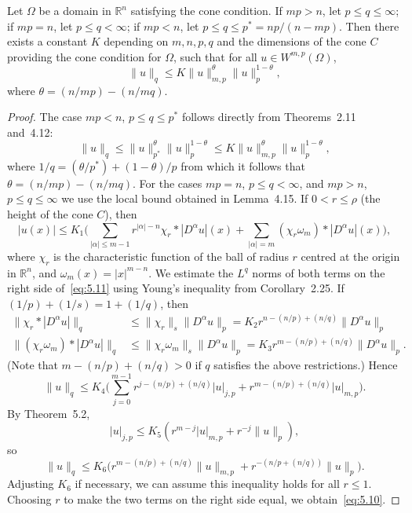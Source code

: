 \begin{theorem}
  Let $\Omega$ be a domain in $\mathbb{R}^n$ satisfying the cone
  condition. If $mp>n$, let $p\leq q\leq\infty$; if $mp=n$,
  let $p\leq q<\infty$; if $mp<n$, let $p\leq q\leq p^*=np/(n-mp)$.
  Then there exists a constant $K$ depending on $m,n,p,q$ and the
  dimensions of the cone $C$ providing the cone condition for $\Omega$,
  such that for all $u\in W^{m,p}(\Omega)$,
  \begin{equation}\label{eq:5.10}
    \|u\|_q \leq K \|u\|_{m,p}^\theta \|u\|_p^{1-\theta},
  \end{equation}
  where $\theta = (n/mp) - (n/mq)$.
\end{theorem}

\begin{proof}
  The case $mp<n$, $p\leq q\leq p^*$ follows directly from Theorems~2.11
  and~4.12:
  \[ \|u\|_q \leq \|u\|_{p^*}^\theta \|u\|_p^{1-\theta}
      \leq K\|u\|_{m,p}^\theta \|u\|_p^{1-\theta}, \]
  where $1/q = (\theta/p^*) + (1-\theta)/p$ from which it follows that
  $\theta = (n/mp) - (n/mq)$. For the cases $mp=n$, $p\leq q<\infty$,
  and $mp>n$, $p\leq q\leq\infty$ we use the local bound obtained in Lemma~4.15.
  If $0<r\leq\rho$ (the height of the cone $C$), then
  \begin{equation}\label{eq:5.11}
    |u(x)| \leq K_1 \biggl(\sum_{|\alpha|\leq m-1} r^{|\alpha|-n} \chi_r * |D^\alpha u|(x)
      + \sum_{|\alpha|=m} (\chi_r\omega_m)*|D^\alpha u|(x)\biggr),
  \end{equation}
  where $\chi_r$ is the characteristic function of the ball of radius $r$
  centred at the origin in $\mathbb{R}^n$, and $\omega_m(x) = |x|^{m-n}$.
  We estimate the $L^q$ norms of both terms on the right side of~\eqref{eq:5.11}
  using Young's inequality from Corollary~2.25. If $(1/p)+(1/s) = 1+(1/q)$, then
  \begin{align*}
    \|\chi_r * |D^\alpha u|\|_q
    & \leq \|\chi_r\|_s \|D^\alpha u\|_p = K_2 r^{n-(n/p)+(n/q)} \|D^\alpha u\|_p \\
      \|(\chi_r\omega_m) * |D^\alpha u|\|_q
    & \leq \|\chi_r\omega_m\|_s \|D^\alpha u\|_p = K_3 r^{m-(n/p)+(n/q)} \|D^\alpha u\|_p.
  \end{align*}
  (Note that $m-(n/p)+(n/q)>0$ if $q$ satisfies the above restrictions.) Hence
  \[ \|u\|_q \leq K_4 \biggl(\sum_{j=0}^{m-1} r^{j-(n/p)+(n/q)} |u|_{j,p}
      + r^{m-(n/p)+(n/q)} |u|_{m,p}\biggr). \]
  By Theorem~5.2,
  \[ |u|_{j,p} \leq K_5 (r^{m-j} |u|_{m,p} + r^{-j} \|u\|_p), \]
  so
  \[ \|u\|_q \leq K_6 \bigl(r^{m-(n/p)+(n/q)} \|u\|_{m,p}
      + r^{-(n/p+(n/q))} \|u\|_p\bigr). \]
  Adjusting $K_6$ if necessary, we can assume this inequality holds for all $r\leq 1$.
  Choosing $r$ to make the two terms on the right side equal, we obtain~\eqref{eq:5.10}.
\end{proof}


